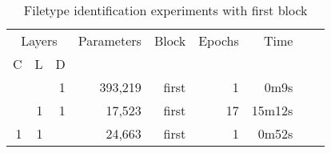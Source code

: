 \begin{table}[!ht]
    \centering
    \caption{Filetype identification experiments with first block}
    \label{tab:carving7-11}
\begin{tabular}{|r|r|r|r|r|r|r|r|r|}
\hline
\multicolumn{3}{|c|}{Layers} & Parameters & Block & Epochs & Time   \\ \cline{1-3}
C        & L       & D       &            &       &        &        \\ \hline
         &         & 1       & 393,219    & first & 1      & 0m9s   \\ \hline
         & 1       & 1       & 17,523     & first & 17     & 15m12s \\ \hline
1        & 1       &         & 24,663     & first & 1      & 0m52s  \\ \hline
\end{tabular}
\end{table}